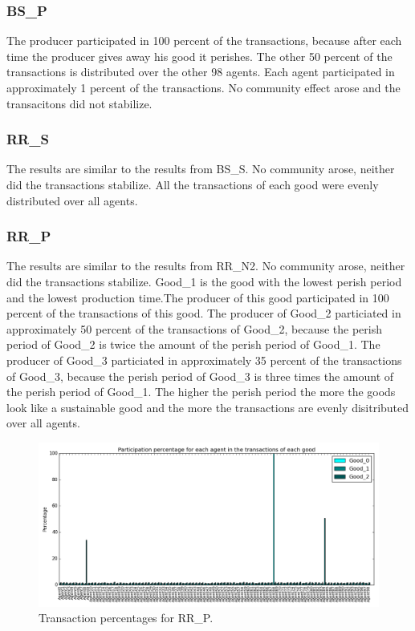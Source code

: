 \documentclass[twoside,openright]{uva-bachelor-thesis}
\begin{document}
\subsubsection{BS\_P}
The producer participated in 100 percent of the transactions, because after each time the producer gives away his good it perishes. The other 50 percent of the transactions is distributed over the other 98 agents. Each agent participated in approximately 1 percent of the transactions. No community effect arose and the transacitons did not stabilize.

\subsubsection{RR\_S}
The results are similar to the results from BS\_S. No community arose, neither did the transactions stabilize. All the transactions of each good were evenly distributed over all agents. 

\subsubsection{RR\_P}
The results are similar to the results from RR\_N2. No community arose, neither did the transactions stabilize. Good\_1 is the good with the lowest perish period and the lowest production time.The producer of this good participated in 100 percent of the transactions of this good. The producer of Good\_2 particiated in approximately 50  percent of the transactions of Good\_2, because the perish period of Good\_2 is twice the amount of the perish period of Good\_1. The producer of Good\_3 particiated in approximately 35 percent of the transactions of Good\_3, because the perish period  of Good\_3 is three times the amount of the perish period of Good\_1. The higher the perish period the more the goods look like a sustainable good and the more the transactions are evenly disitributed over all agents.\\
\begin{figure}[h!]
  \centering
    \includegraphics[scale=0.4]{Simulation_figures/RR_P/Figure1_20k}
  \caption{Transaction percentages for RR\_P.}
\end{figure}
\end{document}

